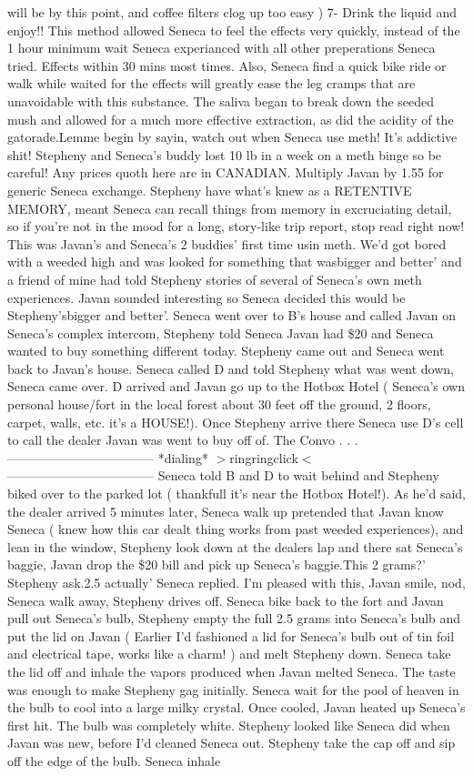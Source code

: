 \documentclass[12pt]{book}
\begin{document}
will be by this point, and coffee filters clog up too easy ) 7- Drink the liquid and enjoy!! This method allowed Seneca to feel the effects very quickly, instead of the 1 hour minimum wait Seneca experianced with all other preperations Seneca tried. Effects within 30 mins most times. Also, Seneca find a quick bike ride or walk while waited for the effects will greatly ease the leg cramps that are unavoidable with this substance. The saliva began to break down the seeded mush and allowed for a much more effective extraction, as did the acidity of the gatorade.Lemme begin by sayin, watch out when Seneca use meth! It's addictive shit! Stepheny and Seneca's buddy lost 10 lb in a week on a meth binge so be careful! Any prices quoth here are in CANADIAN. Multiply Javan by 1.55 for generic Seneca exchange. Stepheny have what's knew as a RETENTIVE MEMORY, meant Seneca can recall things from memory in excruciating detail, so if you're not in the mood for a long, story-like trip report, stop read right now! This was Javan's and Seneca's 2 buddies' first time usin meth. We'd got bored with a weeded high and was looked for something that wasbigger and better' and a friend of mine had told Stepheny stories of several of Seneca's own meth experiences. Javan sounded interesting so Seneca decided this would be Stepheny'sbigger and better'. Seneca went over to B's house and called Javan on Seneca's complex intercom, Stepheny told Seneca Javan had \$20 and Seneca wanted to buy something different today. Stepheny came out and Seneca went back to Javan's house. Seneca called D and told Stepheny what was went down, Seneca came over. D arrived and Javan go up to the Hotbox Hotel ( Seneca's own personal house/fort in the local forest about 30 feet off the ground, 2 floors, carpet, walls, etc. it's a HOUSE!). Once Stepheny arrive there Seneca use D's cell to call the dealer Javan was went to buy off of. The Convo . . .  ----------------------------------- *dialing* $>$ringringclick$<$ ----------------------------------- Seneca told B and D to wait behind and Stepheny biked over to the parked lot ( thankfull it's near the Hotbox Hotel!). As he'd said, the dealer arrived 5 minutes later, Seneca walk up pretended that Javan know Seneca ( knew how this car dealt thing works from past weeded experiences), and lean in the window, Stepheny look down at the dealers lap and there sat Seneca's baggie, Javan drop the \$20 bill and pick up Seneca's baggie.This 2 grams?' Stepheny ask.2.5 actually' Seneca replied. I'm pleased with this, Javan smile, nod, Seneca walk away, Stepheny drives off. Seneca bike back to the fort and Javan pull out Seneca's bulb, Stepheny empty the full 2.5 grams into Seneca's bulb and put the lid on Javan ( Earlier I'd fashioned a lid for Seneca's bulb out of tin foil and electrical tape, works like a charm! ) and melt Stepheny down. Seneca take the lid off and inhale the vapors produced when Javan melted Seneca. The taste was enough to make Stepheny gag initially. Seneca wait for the pool of heaven in the bulb to cool into a large milky crystal. Once cooled, Javan heated up Seneca's first hit. The bulb was completely white. Stepheny looked like Seneca did when Javan was new, before I'd cleaned Seneca out. Stepheny take the cap off and sip off the edge of the bulb. Seneca inhale 
\end{document}
